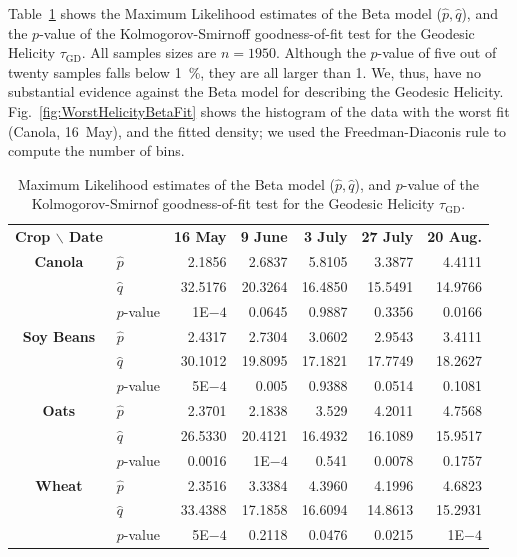 \documentclass[journal]{IEEEtran}
\begin{document}
	Table~\ref{tab:params_helicity} shows the Maximum Likelihood estimates of the Beta model ($\widehat p,\widehat q$), and the $p$-value of the Kolmogorov-Smirnoff goodness-of-fit test for the Geodesic Helicity $\tau_{\text{GD}}$.
	All samples sizes are $n=1950$.
	Although the $p$-value of five out of twenty samples falls below \SI{1}{\percent}, they are all larger than \SI{1}{\pertenmille}.
	We, thus, have no substantial evidence against the Beta model for describing the Geodesic Helicity.
	Fig.~\ref{fig:WorstHelicityBetaFit} shows the histogram of the data with the worst fit (Canola, 16~May), and the fitted density; we used the Freedman-Diaconis rule to compute the number of bins.
	
	\begin{table}[hbt]
		\centering
		\caption{Maximum Likelihood estimates of the Beta model ($\widehat p,\widehat q$), and $p$-value of the Kolmogorov-Smirnof goodness-of-fit test for the Geodesic Helicity $\tau_{\text{GD}}$.}
		\label{tab:params_helicity}
		\setlength{\tabcolsep}{3.8pt}
		\begin{tabular}{clrrrrr}
			\toprule
			\textbf{Crop $\backslash$ Date} & & \textbf{16 May} & \textbf{9 June} & \textbf{3 July} & \textbf{27 July} & \textbf{20 Aug.}\\ \cmidrule(lr){1-2} \cmidrule(lr){3-3} \cmidrule(lr){4-4} \cmidrule(lr){5-5} \cmidrule(lr){6-6} \cmidrule(lr){7-7}
			\textbf{Canola}     
			& $\widehat{p}$ & 2.1856      & 2.6837    & 5.8105     & 3.3877      & 4.4111 \\
			& $\widehat{q}$ & 32.5176     & 20.3264     & 16.4850     & 15.5491     & 14.9766\\ 
			& $p$-value     & 1E$-4$         & 0.0645     & 0.9887     & 0.3356     & 0.0166\\        
			\midrule
			\textbf{Soy Beans}
			& $\widehat{p}$ & 2.4317       & 2.7304       & 3.0602       & 2.9543       & 3.4111 \\
			& $\widehat{q}$ & 30.1012   & 19.8095   & 17.1821   & 17.7749   & 18.2627 \\ 
			& $p$-value     & 5E$-4$     & 0.005     & 0.9388     & 0.0514     & 0.1081\\            
			\midrule
			\textbf{Oats}
			& $\widehat{p}$ & 2.3701       & 2.1838      & 3.529     & 4.2011     & 4.7568 \\
			& $\widehat{q}$ & 26.5330     & 20.4121   & 16.4932     & 16.1089      & 15.9517 \\ 
			& $p$-value     & 0.0016     & 1E$-4$     & 0.541     & 0.0078    & 0.1757 \\
			\midrule
			\textbf{Wheat} 
			& $\widehat{p}$ & 2.3516       & 3.3384      & 4.3960      & 4.1996      & 4.6823   \\
			& $\widehat{q}$ & 33.4388   & 17.1858   & 16.6094   & 14.8613   & 15.2931   \\
			& $p$-value     & 5E$-4$     & 0.2118     & 0.0476     & 0.0215     & 1E$-4$\\    
			\bottomrule
		\end{tabular}
	\end{table}
	
\end{document}
